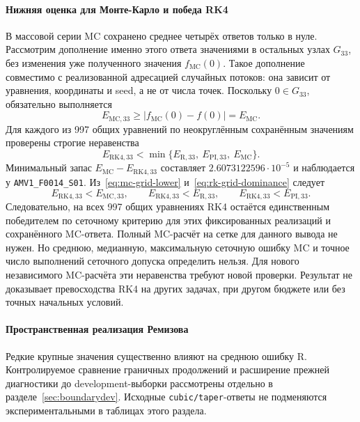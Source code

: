 \documentclass[14pt,a4paper]{extarticle}
\DeclareRobustCommand{\code}[1]{\texttt{\let\savedunderscore\_\def\_{\savedunderscore\allowbreak}#1}}
\begin{document}
\paragraph{Нижняя оценка для Монте-Карло и победа RK4\\}
В массовой серии MC сохранено среднее четырёх ответов только в нуле.
Рассмотрим дополнение именно этого ответа значениями в остальных
узлах $G_{33}$, без изменения уже полученного значения $f_{\mathrm{MC}}(0)$.
Такое дополнение совместимо с реализованной адресацией случайных
потоков: она зависит от уравнения, координаты и seed, а не от числа
точек. Поскольку $0\in G_{33}$, обязательно выполняется
\begin{equation}\label{eq:mc-grid-lower}
E_{\mathrm{MC},33}\ge
|f_{\mathrm{MC}}(0)-f(0)|=E_{\mathrm{MC}}.
\end{equation}
Для каждого из 997 общих уравнений по неокруглённым сохранённым
значениям проверены строгие неравенства
\begin{equation}\label{eq:rk-grid-dominance}
E_{\mathrm{RK4},33}<
\min\{E_{\mathrm{R},33},\ E_{\mathrm{PI},33},\ E_{\mathrm{MC}}\}.
\end{equation}
Минимальный запас $E_{\mathrm{MC}}-E_{\mathrm{RK4},33}$ составляет
$2.6073122596\cdot10^{-5}$ и наблюдается у
\texttt{AMV1\_F0014\_S01}. Из~\eqref{eq:mc-grid-lower}
и~\eqref{eq:rk-grid-dominance} следует
\[
E_{\mathrm{RK4},33}<E_{\mathrm{MC},33},\qquad
E_{\mathrm{RK4},33}<E_{\mathrm{R},33},\qquad
E_{\mathrm{RK4},33}<E_{\mathrm{PI},33}.
\]
Следовательно, на всех 997 общих уравнениях RK4 остаётся единственным
победителем по сеточному критерию для этих фиксированных реализаций
и сохранённого MC-ответа. Полный MC-расчёт на сетке для данного
вывода не нужен. Но среднюю, медианную, максимальную сеточную ошибку
MC и точное число выполнений сеточного допуска определить нельзя.
Для нового независимого MC-расчёта эти неравенства требуют новой
проверки. Результат не доказывает превосходства RK4 на других задачах,
при другом бюджете или без точных начальных условий.

\paragraph{Пространственная реализация Ремизова\\}
Редкие крупные значения существенно влияют на среднюю ошибку R.
Контролируемое сравнение граничных продолжений и расширение прежней
диагностики до development-выборки рассмотрены отдельно
в разделе~\ref{sec:boundarydev}. Исходные \code{cubic/taper}-ответы
не подменяются экспериментальными в таблицах этого раздела.
\end{document}
